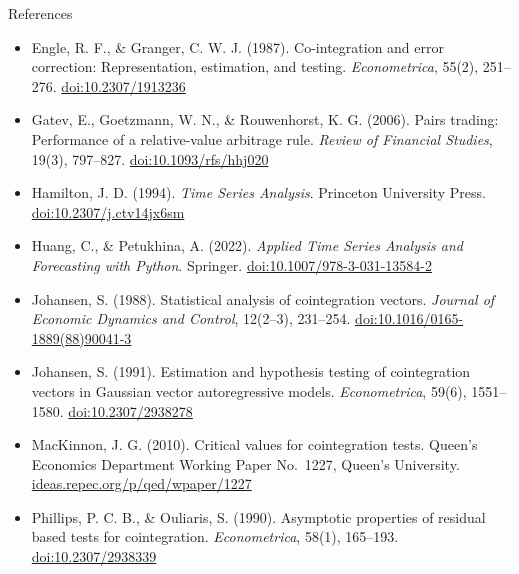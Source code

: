 \begin{frame}{References}
\itemsize{\tiny}
\begin{itemize}
    \item Engle, R. F., \& Granger, C. W. J. (1987). Co-integration and error correction: Representation, estimation, and testing. \textit{Econometrica}, 55(2), 251--276. \href{https://doi.org/10.2307/1913236}{doi:10.2307/1913236}
    \item Gatev, E., Goetzmann, W. N., \& Rouwenhorst, K. G. (2006). Pairs trading: Performance of a relative-value arbitrage rule. \textit{Review of Financial Studies}, 19(3), 797--827. \href{https://doi.org/10.1093/rfs/hhj020}{doi:10.1093/rfs/hhj020}
    \item Hamilton, J. D. (1994). \textit{Time Series Analysis}. Princeton University Press. \href{https://doi.org/10.2307/j.ctv14jx6sm}{doi:10.2307/j.ctv14jx6sm}
    \item Huang, C., \& Petukhina, A. (2022). \textit{Applied Time Series Analysis and Forecasting with Python}. Springer. \href{https://doi.org/10.1007/978-3-031-13584-2}{doi:10.1007/978-3-031-13584-2}
    \item Johansen, S. (1988). Statistical analysis of cointegration vectors. \textit{Journal of Economic Dynamics and Control}, 12(2--3), 231--254. \href{https://doi.org/10.1016/0165-1889(88)90041-3}{doi:10.1016/0165-1889(88)90041-3}
    \item Johansen, S. (1991). Estimation and hypothesis testing of cointegration vectors in Gaussian vector autoregressive models. \textit{Econometrica}, 59(6), 1551--1580. \href{https://doi.org/10.2307/2938278}{doi:10.2307/2938278}
    \item MacKinnon, J. G. (2010). Critical values for cointegration tests. Queen's Economics Department Working Paper No.~1227, Queen's University. \href{https://ideas.repec.org/p/qed/wpaper/1227.html}{ideas.repec.org/p/qed/wpaper/1227}
    \item Phillips, P. C. B., \& Ouliaris, S. (1990). Asymptotic properties of residual based tests for cointegration. \textit{Econometrica}, 58(1), 165--193. \href{https://doi.org/10.2307/2938339}{doi:10.2307/2938339}
\end{itemize}
\end{frame}


